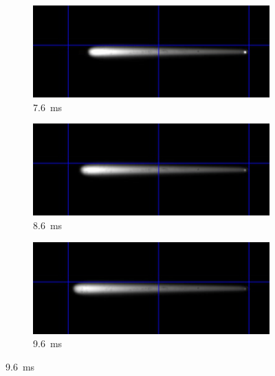 \begin{figure}[h]
\begin{subfigure}[t]{0.47\textwidth}
        \end{subfigure}
        \hfill
        \begin{subfigure}[t]{0.47\textwidth}
            \centering
            \includegraphics[width=\textwidth]{assets/5 results/1msFrames/76.jpg}
            \caption{\qty{7.6}{ms}}
            \label{fig:growth_frames_76}
        \end{subfigure}
        \hfill
        \begin{subfigure}[t]{0.47\textwidth}
            \centering
            \includegraphics[width=\textwidth]{assets/5 results/1msFrames/86.jpg}
            \caption{\qty{8.6}{ms}}
            \label{fig:growth_frames_86}
        \end{subfigure}
        \hfill
        \begin{subfigure}[t]{0.47\textwidth}
            \centering
            \includegraphics[width=\textwidth]{assets/5 results/1msFrames/96.jpg}
            \caption{\qty{9.6}{ms}}
            \label{fig:growth_frames_96}

\end{subfigure}
\end{figure}
